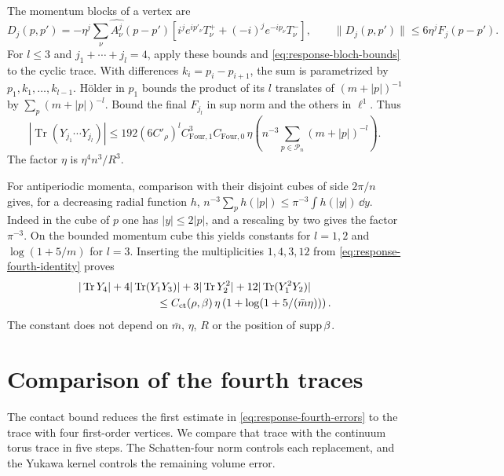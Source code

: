 The momentum blocks of a vertex are
\[
 D_j(p,p')=-\eta^j\sum_\nu\widehat{A_\nu^j}(p-p')
       [i^je^{ip'_\nu}T_\nu^++(-i)^je^{-ip_\nu}T_\nu^-],
 \qquad\|D_j(p,p')\|\le6\eta^jF_j(p-p').
\]
For $l\le3$ and $j_1+\cdots+j_l=4$, apply these bounds
and \eqref{eq:response-bloch-bounds} to the cyclic trace.
With differences $k_i=p_i-p_{i+1}$, the sum is parametrized
by $p_1,k_1,\ldots,k_{l-1}$. H\"older in $p_1$ bounds
the product of its $l$ translates of $(m+|p|)^{-1}$ by
$\sum_p(m+|p|)^{-l}$. Bound the final $F_{j_l}$ in sup
norm and the others in $\ell^1$. Thus
\begin{equation}\label{eq:response-cyclic-contact}
 |\operatorname{Tr}(Y_{j_1}\cdots Y_{j_l})|
   \le192(6C'_\rho)^l C_{\mathrm{Four},1}^3C_{\mathrm{Four},0}\,
          \eta\left(n^{-3}\sum_{p\in\mathcal P_n}(m+|p|)^{-l}\right).
\end{equation}
The factor $\eta$ is $\eta^4n^3/R^3$.

For antiperiodic momenta, comparison with their disjoint
cubes of side $2\pi/n$ gives, for a decreasing radial
function $h$, $n^{-3}\sum_ph(|p|)\le\pi^{-3}\int h(|y|)\,\dd y$.
Indeed in the cube of $p$ one has $|y|\le2|p|$, and a
rescaling by two gives the factor $\pi^{-3}$. On the
bounded momentum cube this yields constants for $l=1,2$
and $\log(1+5/m)$ for $l=3$. Inserting the multiplicities
$1,4,3,12$ from \eqref{eq:response-fourth-identity} proves
\begin{equation}\label{eq:response-contact-bound}
 \begin{split}
 &|\operatorname{Tr}Y_4|+4|\operatorname{Tr}(Y_1Y_3)|
          +3|\operatorname{Tr}Y_2^2|+12|\operatorname{Tr}(Y_1^2Y_2)|\\
 &\hspace{25mm}\le C_{\mathrm{ct}}(\rho,\beta)\,
               \eta\left(1+\log(1+5/(\bar m\eta))\right).
 \end{split}
\end{equation}
The constant does not depend on $\bar m$, $\eta$, $R$ or
the position of $\operatorname{supp}\beta$.

\section{Comparison of the fourth traces}\label{subsec:response-fourth}

The contact bound reduces the first estimate in
\eqref{eq:response-fourth-errors} to the trace with four first-order
vertices. We compare that trace with the continuum torus trace in
five steps. The Schatten-four norm controls each replacement,
and the Yukawa kernel controls the remaining volume error.

